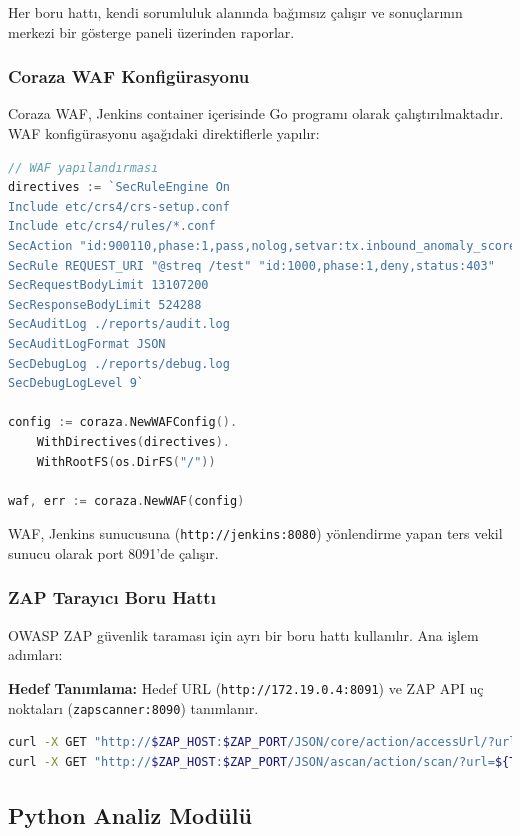 Her boru hattı, kendi sorumluluk alanında bağımsız çalışır ve sonuçlarının merkezi bir gösterge paneli üzerinden raporlar.

\subsubsection{Coraza WAF Konfigürasyonu}

Coraza WAF, Jenkins container içerisinde Go programı olarak çalıştırılmaktadır. WAF konfigürasyonu aşağıdaki direktiflerle yapılır:

\begin{lstlisting}[language=go]
// WAF yapılandırması
directives := `SecRuleEngine On
Include etc/crs4/crs-setup.conf
Include etc/crs4/rules/*.conf
SecAction "id:900110,phase:1,pass,nolog,setvar:tx.inbound_anomaly_score_threshold=5,setvar:tx.outbound_anomaly_score_threshold=4"
SecRule REQUEST_URI "@streq /test" "id:1000,phase:1,deny,status:403"
SecRequestBodyLimit 13107200
SecResponseBodyLimit 524288
SecAuditLog ./reports/audit.log
SecAuditLogFormat JSON
SecDebugLog ./reports/debug.log
SecDebugLogLevel 9`

config := coraza.NewWAFConfig().
    WithDirectives(directives).
    WithRootFS(os.DirFS("/"))

waf, err := coraza.NewWAF(config)
\end{lstlisting}

WAF, Jenkins sunucusuna (\texttt{http://jenkins:8080}) yönlendirme yapan ters vekil sunucu olarak port 8091'de çalışır.

\subsubsection{ZAP Tarayıcı Boru Hattı}

OWASP ZAP güvenlik taraması için ayrı bir boru hattı kullanılır. Ana işlem adımları:

\textbf{Hedef Tanımlama:}
Hedef URL (\texttt{http://172.19.0.4:8091}) ve ZAP API uç noktaları (\texttt{zapscanner:8090}) tanımlanır.

\begin{lstlisting}[language=bash]
curl -X GET "http://$ZAP_HOST:$ZAP_PORT/JSON/core/action/accessUrl/?url=${TARGET_URL}"
curl -X GET "http://$ZAP_HOST:$ZAP_PORT/JSON/ascan/action/scan/?url=${TARGET_URL}"
\end{lstlisting}

\newpage

\subsection{Python Analiz Modülü}

